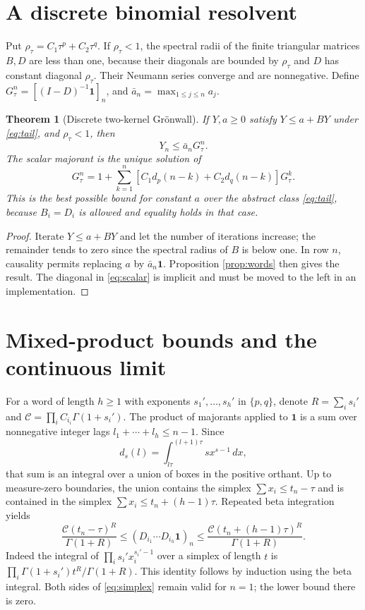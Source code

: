\documentclass[11pt,a4paper]{article}
\newtheorem{theorem}{Theorem}
\newcommand{\one}{\mathbf1}
\begin{document}
\section{A discrete binomial resolvent}
Put $\rho_\tau=C_1\tau^p+C_2\tau^q$. If $\rho_\tau<1$, the spectral radii of the finite triangular matrices $B,D$ are less than one, because their diagonals are bounded by $\rho_\tau$ and $D$ has constant diagonal $\rho_\tau$. Their Neumann series converge and are nonnegative. Define $G_\tau^n=[(I-D)^{-1}\one]_n$, and $\bar a_n=\max_{1\le j\le n}a_j$.
\begin{theorem}[Discrete two-kernel Gr\"onwall]\label{thm:compare}
If $Y,a\ge0$ satisfy $Y\le a+BY$ under \eqref{eq:tail}, and $\rho_\tau<1$, then
\[Y_n\le \bar a_nG_\tau^n.\]
The scalar majorant is the unique solution of
\begin{equation}\label{eq:scalar}
 G_\tau^n=1+\sum_{k=1}^n[C_1d_p(n-k)+C_2d_q(n-k)]G_\tau^k.
\end{equation}
This is the best possible bound for constant $a$ over the abstract class \eqref{eq:tail}, because $B_i=D_i$ is allowed and equality holds in that case.
\end{theorem}
\begin{proof}
Iterate $Y\le a+BY$ and let the number of iterations increase; the remainder tends to zero since the spectral radius of $B$ is below one. In row $n$, causality permits replacing $a$ by $\bar a_n\one$. Proposition \ref{prop:words} then gives the result. The diagonal in \eqref{eq:scalar} is implicit and must be moved to the left in an implementation.
\end{proof}
\section{Mixed-product bounds and the continuous limit}
For a word of length $h\ge1$ with exponents $s_1',\ldots,s_h'$ in $\{p,q\}$, denote $R=\sum_i s_i'$ and $\mathcal C=\prod_i C_{i_i}\Gamma(1+s_i')$. The product of majorants applied to $\one$ is a sum over nonnegative integer lags $l_1+\cdots+l_h\le n-1$. Since
\[
 d_s(l)=\int_{l\tau}^{(l+1)\tau}s x^{s-1}\,dx,
\]
that sum is an integral over a union of boxes in the positive orthant. Up to measure-zero boundaries, the union contains the simplex $\sum x_i\le t_n-\tau$ and is contained in the simplex $\sum x_i\le t_n+(h-1)\tau$. Repeated beta integration yields
\begin{equation}\label{eq:simplex}
 \frac{\mathcal C(t_n-\tau)^R}{\Gamma(1+R)}
 \le (D_{i_1}\cdots D_{i_h}\one)_n
 \le \frac{\mathcal C(t_n+(h-1)\tau)^R}{\Gamma(1+R)}.
\end{equation}
Indeed the integral of $\prod_i s_i'x_i^{s_i'-1}$ over a simplex of length $t$ is $\prod_i\Gamma(1+s_i')t^R/\Gamma(1+R)$. This identity follows by induction using the beta integral. Both sides of \eqref{eq:simplex} remain valid for $n=1$; the lower bound there is zero.
\end{document}
